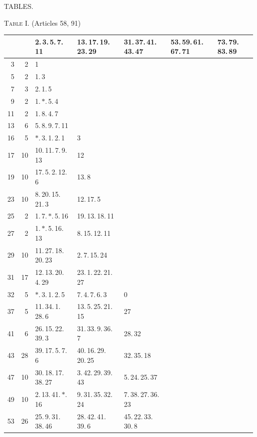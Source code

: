 \begin{landscape}\thispagestyle{empty}

\centerline{\large TABLES.}\smallskip

\centerline{\textsc{Table I.} (Articles 58, 91)}\smallskip
\begingroup\centering\fontsize{10}{11}\selectfont\renewcommand{\arraystretch}{0.87}\setlength{\tabcolsep}{4pt}
\begin{tabular}{r||r|lllll}\hline
 & & 2.\,3.\,5.\,7.\,11 & 13.\,17.\,19.\,23.\,29 & 31.\,37.\,41.\,43.\,47 & 53.\,59.\,61.\,67.\,71 & 73.\,79.\,83.\,89\\\hline
3 & 2 & 1 &  &  &  & \\
5 & 2 & 1.\,3 &  &  &  & \\
7 & 3 & 2.\,1.\,5 &  &  &  & \\
9 & 2 & 1.\,\(\ast\).\,5.\,4 &  &  &  & \\
11 & 2 & 1.\,8.\,4.\,7 &  &  &  & \\
13 & 6 & 5.\,8.\,9.\,7.\,11 &  &  &  & \\
16 & 5 & \(\ast\).\,3.\,1.\,2.\,1 & 3 &  &  & \\
17 & 10 & 10.\,11.\,7.\,9.\,13 & 12 &  &  & \\
19 & 10 & 17.\,5.\,2.\,12.\,6 & 13.\,8 &  &  & \\
23 & 10 & 8.\,20.\,15.\,21.\,3 & 12.\,17.\,5 &  &  & \\
25 & 2 & 1.\,7.\,\(\ast\).\,5.\,16 & 19.\,13.\,18.\,11 &  &  & \\
27 & 2 & 1.\,\(\ast\).\,5.\,16.\,13 & 8.\,15.\,12.\,11 &  &  & \\
29 & 10 & 11.\,27.\,18.\,20.\,23 & 2.\,7.\,15.\,24 &  &  & \\
31 & 17 & 12.\,13.\,20.\,4.\,29 & 23.\,1.\,22.\,21.\,27 &  &  & \\
32 & 5 & \(\ast\).\,3.\,1.\,2.\,5 & 7.\,4.\,7.\,6.\,3 & 0 &  & \\
37 & 5 & 11.\,34.\,1.\,28.\,6 & 13.\,5.\,25.\,21.\,15 & 27 &  & \\
41 & 6 & 26.\,15.\,22.\,39.\,3 & 31.\,33.\,9.\,36.\,7 & 28.\,32 &  & \\
43 & 28 & 39.\,17.\,5.\,7.\,6 & 40.\,16.\,29.\,20.\,25 & 32.\,35.\,18 &  & \\
47 & 10 & 30.\,18.\,17.\,38.\,27 & 3.\,42.\,29.\,39.\,43 & 5.\,24.\,25.\,37 &  & \\
49 & 10 & 2.\,13.\,41.\,\(\ast\).\,16 & 9.\,31.\,35.\,32.\,24 & 7.\,38.\,27.\,36.\,23 &  & \\
53 & 26 & 25.\,9.\,31.\,38.\,46 & 28.\,42.\,41.\,39.\,6 & 45.\,22.\,33.\,30.\,8 &  & \\

\end{tabular}
\end{landscape}
